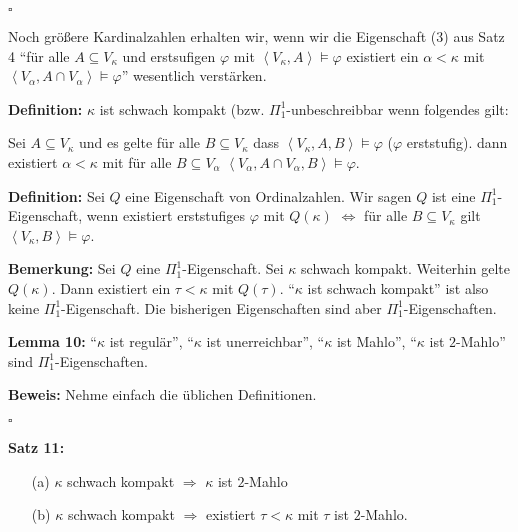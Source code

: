 \documentclass[a4paper,fontsize=11pt]{scrartcl}
\begin{document}
\hfill $\square$

Noch größere Kardinalzahlen erhalten wir, wenn wir die Eigenschaft (3)
aus Satz 4 ``für alle $A\subseteq V_\kappa$ und erstsufigen $\varphi$
mit $\left<V_\kappa,A\right>\models\varphi$ existiert ein
$\alpha<\kappa$ mit $\left<V_\alpha,A\cap
V_\alpha\right>\models\varphi$'' wesentlich verstärken.

{\bf Definition:} $\kappa$ ist schwach kompakt
(bzw. $\Pi_1^1$-unbeschreibbar wenn folgendes gilt:

Sei $A\subseteq V_\kappa$ und es gelte für alle $B\subseteq V_\kappa$
dass $\left<V_\kappa, A, B\right>\models\varphi$ ($\varphi$
erststufig). dann existiert $\alpha<\kappa$ mit für alle $B\subseteq
V_\alpha$ $\left<V_\alpha,A\cap V_\alpha,B\right>\models\varphi$.

{\bf Definition:} Sei $Q$ eine Eigenschaft von Ordinalzahlen. Wir
sagen $Q$ ist eine $\Pi_1^1$-Eigenschaft, wenn existiert erststufiges
$\varphi$ mit $Q(\kappa)$ $\Leftrightarrow$ für alle $B\subseteq
V_\kappa$ gilt $\left<V_\kappa,B\right>\models\varphi$.

{\bf Bemerkung:} Sei $Q$ eine $\Pi_1^1$-Eigenschaft. Sei $\kappa$
schwach kompakt. Weiterhin gelte $Q(\kappa)$. Dann existiert ein
$\tau<\kappa$ mit $Q(\tau)$. ``$\kappa$ ist schwach kompakt'' ist also
keine $\Pi_1^1$-Eigenschaft. Die bisherigen Eigenschaften sind aber
$\Pi_1^1$-Eigenschaften.

{\bf Lemma 10:} ``$\kappa$ ist regulär'', ``$\kappa$ ist
unerreichbar'', ``$\kappa$ ist Mahlo'', ``$\kappa$ ist $2$-Mahlo''
sind $\Pi_1^1$-Eigenschaften.

{\bf Beweis:} Nehme einfach die üblichen Definitionen.

\hfill $\square$

{\bf Satz 11:}
\begin{itemize}
\item[(a)] $\kappa$ schwach kompakt $\Rightarrow$ $\kappa$ ist
  $2$-Mahlo
\item[(b)] $\kappa$ schwach kompakt $\Rightarrow$ existiert
  $\tau<\kappa$ mit $\tau$ ist $2$-Mahlo.
\end{itemize}
\end{document}
